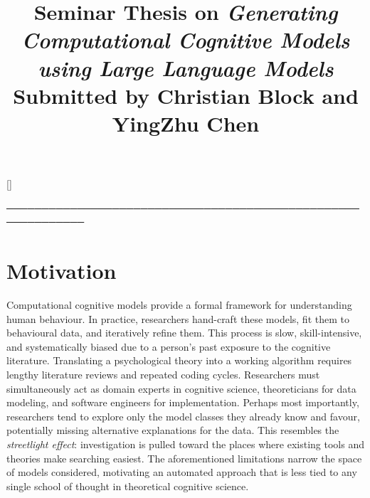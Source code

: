\titleformat{\section}{\large\bfseries}{}{0em}{}[\titlerule]
\titleformat{\subsection}{\normalsize\bfseries}{}{0em}{}

\title{\textbf{Seminar Thesis on \textit{Generating Computational Cognitive Models
using Large Language Models}}\\
\large Submitted by Christian Block and YingZhu Chen}

\author{}
\date{}



\maketitle
\tableofcontents

─────────────────────────────────────────────────────────────
\section{Motivation}

Computational cognitive models provide a formal framework for understanding human behaviour. In practice, researchers hand-craft these models, fit them to behavioural data, and iteratively refine them. This process is slow, skill-intensive, and systematically biased due to a person's past exposure to the cognitive literature. Translating a psychological theory into a working algorithm requires lengthy literature reviews and repeated coding cycles. Researchers must simultaneously act as domain experts in cognitive science, theoreticians for data modeling, and software engineers for implementation. Perhaps most importantly, researchers tend to explore only the model classes they already know and favour, potentially missing alternative explanations for the data. This resembles the \emph{streetlight effect}: investigation is pulled toward the places where existing tools and theories make searching easiest. The aforementioned limitations narrow the space of models considered, motivating an automated approach that is less tied to any single school of thought in theoretical cognitive science.\\

